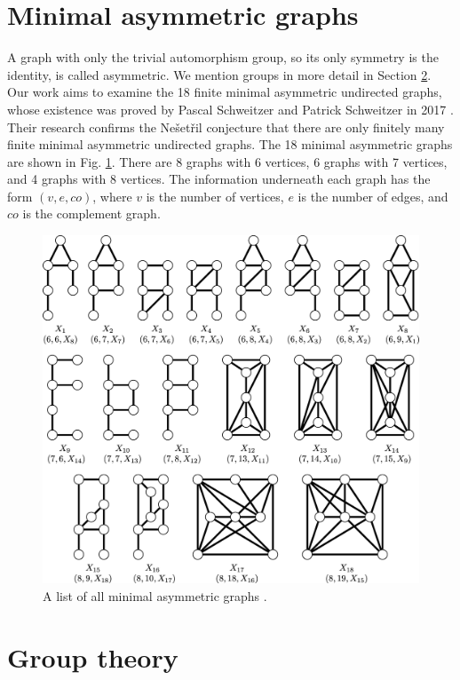 \section{Minimal asymmetric graphs}

A graph with only the trivial automorphism group, so its only symmetry is the identity, is called asymmetric. We mention groups in more detail in Section \ref{sec:groups}. Our work aims to examine the 18 finite minimal asymmetric undirected graphs, whose existence was proved by Pascal Schweitzer and Patrick Schweitzer in 2017 \cite{sch17}. Their research confirms the Nešetřil conjecture that there are only finitely many finite minimal asymmetric undirected graphs. The 18 minimal asymmetric graphs are shown in Fig. \ref{fig:minimal_asymmetric}. There are 8 graphs with 6 vertices, 6 graphs with 7 vertices, and 4 graphs with 8 vertices. The information underneath each graph has the form $(v, e, co)$, where $v$ is the number of vertices, $e$ is the number of edges, and $co$ is the complement graph.

\begin{figure}[H]
\includegraphics[width=\textwidth,height=\textheight,keepaspectratio]{images/minimal_asymmetric.png}
\caption{A list of all minimal asymmetric graphs \cite{sch17}.}
\label{fig:minimal_asymmetric}
\end{figure}

\section{Group theory}
\label{sec:groups}

